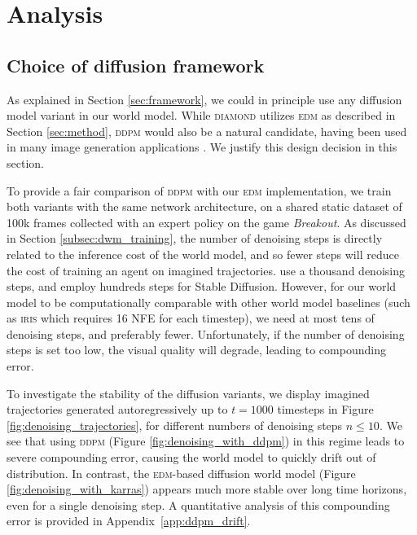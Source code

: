 \vspace{-2mm}
\section{Analysis}
\label{sec:analysis}
\vspace{-1mm}

\subsection{Choice of diffusion framework}
\label{subsec:diffusion_choice}
\vspace{-1mm}

As explained in Section \ref{sec:framework}, we could in principle use any diffusion model variant in our world model. While \textsc{diamond} utilizes \textsc{edm} \citep{karras2022elucidating} as described in Section \ref{sec:method}, \textsc{ddpm} \citep{ho2020DDPM} would also be a natural candidate, having been used in many image generation applications \citep{ldm_stable_diffusion, ddpm++}. We justify this design decision in this section.

To provide a fair comparison of \textsc{ddpm} with our \textsc{edm} implementation, we train both variants with the same network architecture, on a shared static dataset of 100k frames collected with an expert policy on the game \textit{Breakout}. As discussed in Section \ref{subsec:dwm_training}, the number of denoising steps is directly related to the inference cost of the world model, and so fewer steps will reduce the cost of training an agent on imagined trajectories. \citet{ho2020DDPM} use a thousand denoising steps, and \citet{ldm_stable_diffusion} employ hundreds steps for Stable Diffusion. However, for our world model to be computationally comparable with other world model baselines (such as \textsc{iris} which requires 16 NFE for each timestep), we need at most tens of denoising steps, and preferably fewer. Unfortunately, if the number of denoising steps is set too low, the visual quality will degrade, leading to compounding error. 

To investigate the stability of the diffusion variants, we display imagined trajectories generated autoregressively up to $t=1000$ timesteps in Figure \ref{fig:denoising_trajectories}, for different numbers of denoising steps $n \le 10$. We see that using \textsc{ddpm} (Figure \ref{fig:denoising_with_ddpm}) in this regime leads to severe compounding error, causing the world model to quickly drift out of distribution. In contrast, the \textsc{edm}-based diffusion world model (Figure \ref{fig:denoising_with_karras}) appears much more stable over long time horizons, even for a single denoising step. A quantitative analysis of this compounding error is provided in Appendix~\ref{app:ddpm_drift}.

